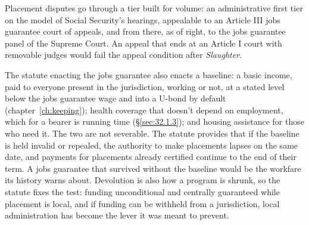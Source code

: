 Placement disputes go through a tier built for volume: an administrative first tier on the model of Social Security's hearings, appealable to an Article III jobs guarantee court of appeals, and from there, as of right, to the jobs guarantee panel of the Supreme Court. An appeal that ends at an Article I court with removable judges would fail the appeal condition after \emph{Slaughter}.

The statute enacting the jobs guarantee also enacts a baseline: a basic income, paid to everyone present in the jurisdiction, working or not, at a stated level below the jobs guarantee wage and into a U-bond by default (chapter~\ref{ch:keeping}); health coverage that doesn't depend on employment, which for a bearer is running time (\S\ref{sec:32.1.3}); and housing assistance for those who need it. The two are not severable. The statute provides that if the baseline is held invalid or repealed, the authority to make placements lapses on the same date, and payments for placements already certified continue to the end of their term. A jobs guarantee that survived without the baseline would be the workfare its history warns about. Devolution is also how a program is shrunk, so the statute fixes the test: funding unconditional and centrally guaranteed while placement is local, and if funding can be withheld from a jurisdiction, local administration has become the lever it was meant to prevent.


